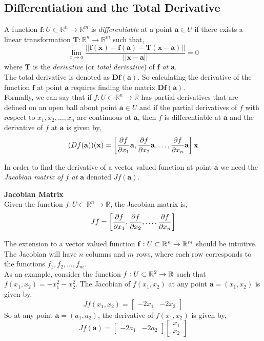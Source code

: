 \documentclass[12pt]{article}
\begin{document}
\subsection{Differentiation and the Total Derivative}

 A function $\mathbf{f}:U\subset \mathbb{R}^n\rightarrow\mathbb{R}^m$ is \emph{differentiable} at a point $\mathbf{a}\in U$ if there exists a linear transformation $\mathbf{T}:\mathbb{R}^n\rightarrow\mathbb{R}^m$ such that,
\[
\lim_{x\rightarrow a}\frac{|| \mathbf{f(x)}-\mathbf{f(a)}-\mathbf{T(x-a)} ||}{|| \mathbf{x-a} ||}=0
\]
where $\mathbf{T}$ is the \emph{derivative} (or \emph{total derivative}) of \emph{$\mathbf{f}$ at $\mathbf{a}$}.\\

 The total derivative is denoted as $\mathbf{Df(a)}$. So calculating the derivative of the function $\mathbf{f}$ at point $\mathbf{a}$ requires finding the matrix $\mathbf{Df(a)}$. \\

 Formally, we can say that if $f:U\subset\mathbb{R}^n\rightarrow\mathbb{R}$ has partial derivatives that are defined on an open ball about point $\mathbf{a}\in U$ and if the partial derivatives of $f$ with respect to $x_1,x_2,\ldots,x_n$ are continuous at $\mathbf{a}$, then $f$ is differentiable at $\mathbf{a}$ and the derivative of $f$ at $\mathbf{a}$ is given by,
\[
(Df(\mathbf{a}))(\mathbf{x}) = \left[ \frac{\partial f}{\partial x_1}\mathbf{a},\frac{\partial f}{\partial x_2}\mathbf{a},\ldots, \frac{\partial f}{\partial x_n}\mathbf{a} \right]\mathbf{x}
\] 

 In order to find the derivative of a vector valued function at point $\mathbf{a}$ we need the \emph{Jacobian matrix of $f$ at $\mathbf{a}$} denoted $Jf(\mathbf{a})$. \\

\begin{framed}
\textbf{Jacobian Matrix} \\ 
Given the function $f:U\subset\mathbb{R}^n\rightarrow\mathbb{R}$, the Jacobian matrix is,
\[
Jf = \left[ \frac{\partial f}{\partial x_1},\frac{\partial f}{\partial x_2},\ldots,\frac{\partial f}{\partial x_n} \right]
\]
\end{framed}

The extension to a vector valued function $\mathbf{f}:U\subset\mathbb{R}^n\rightarrow\mathbb{R}^m$ should be intuitive. The Jacobian will have $n$ columns and $m$ rows, where each row corresponds to the functions $f_1,f_2,\ldots,f_m$. \\

 As an example, consider the function $f:U\subset\mathbb{R}^2\rightarrow\mathbb{R}$ such that $f(x_1,x_2) = -x_1^2-x_2^2$. The Jacobian of $f(x_1,x_2)$ at any point $\mathbf{a}=(x_1,x_2)$ is given by,
\[
Jf(x_1,x_2) =
\begin{bmatrix}
-2x_1 & -2x_2
\end{bmatrix}
\]
So at any point $\mathbf{a} = (a_1,a_2)$, the derivative of $f(x_1,x_2)$ is given by,
\[
Jf(\mathbf{a}) =
\begin{bmatrix}
-2a_1 & -2a_2
\end{bmatrix}
\begin{bmatrix}
x_1 \\
x_2
\end{bmatrix}
\] \\
\end{document}
